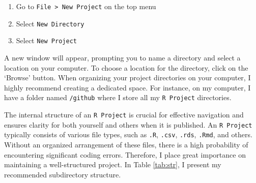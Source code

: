 \documentclass[
]{article}
\providecommand{\tightlist}{%
  \setlength{\itemsep}{0pt}\setlength{\parskip}{0pt}}
\begin{document}
\begin{enumerate}
\def\labelenumi{\alph{enumi}.}
\tightlist
\item
  Go to \texttt{File\ \textgreater{}\ New\ Project} on the top menu
\item
  Select \texttt{New\ Directory}
\item
  Select \texttt{New\ Project}
\end{enumerate}

A new window will appear, prompting you to name a directory and select a location on your computer. To choose a location for the directory, click on the `Browse' button. When organizing your project directories on your computer, I highly recommend creating a dedicated space. For instance, on my computer, I have a folder named \texttt{/github} where I store all my \texttt{R\ Project} directories.

The internal structure of an \texttt{R\ Project} is crucial for effective navigation and ensures clarity for both yourself and others when it is published. An \texttt{R\ Project} typically consists of various file types, such as \texttt{.R}, \texttt{.csv}, \texttt{.rds}, \texttt{.Rmd}, and others. Without an organized arrangement of these files, there is a high probability of encountering significant coding errors. Therefore, I place great importance on maintaining a well-structured project. In Table \ref{tab:str}, I present my recommended subdirectory structure.
\end{document}

